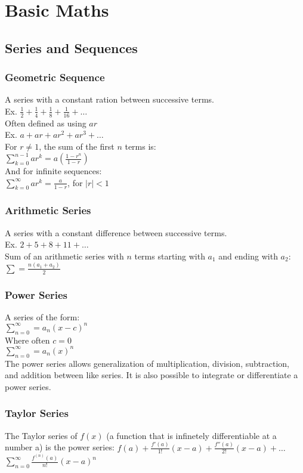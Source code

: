 \section*{Basic Maths}

\subsection*{Series and Sequences}
\subsubsection*{Geometric Sequence}
A series with a constant ration between successive terms.\\
Ex.  $\frac{1}{2}+ \frac{1}{4}+ \frac{1}{8}+ \frac{1}{16}+\ldots$\\
Often defined as using $ar$\\
Ex.  $a+ar+ar^2+ar^3+\ldots$\\
For $r\neq1$, the sum of the first $n$ terms is:\\
$\sum_{k=0}^{n-1}ar^k=a(\frac{1-r^n}{1-r})$\\
And for infinite sequences:\\
$\sum_{k=0}^{\infty}ar^k=\frac{a}{1-r}$, for $|r|<1$\\

\subsubsection*{Arithmetic Series}
A series with a constant difference between successive terms.\\
Ex.  $2+5+8+11+\ldots$\\
Sum of an arithmetic series with $n$ terms starting with $a_1$ and ending with $a_2$:\\
$\sum=\frac{n(a_1+a_2)}{2}$

\subsubsection*{Power Series}
A series of the form:\\
$\sum_{n=0}^{\infty}=a_n(x-c)^n$\\
Where often $c=0$\\
$\sum_{n=0}^{\infty}=a_n(x)^n$\\
The power series allows generalization of multiplication, division, subtraction, and addition between 
like series. It is also possible to integrate or differentiate a power series.


\subsubsection*{Taylor Series}
The Taylor series of $f(x)$ (a function that is infinetely differentiable at a number a) is the
power series:
$f(a)+\frac{f'(a)}{1!}(x-a)+\frac{f''(a)}{2!}(x-a)+\ldots$
$\sum_{n=0}^\infty\frac{f^{(n)}(a)}{n!}(x-a)^n$

